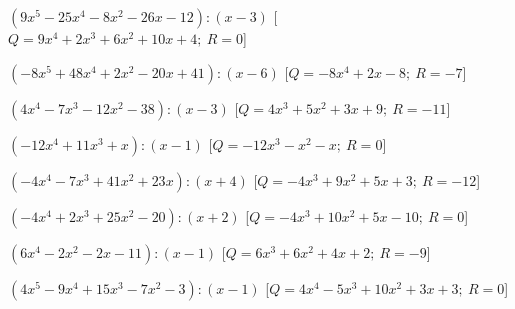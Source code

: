 \begin{esercizio}
\begin{enumeratea}
  \item  \(\left(9 x^5 -25 x^4 -8 x^2 -26 x -12 \right) : 
           \left(x -3 \right)\)
   \hfill [\(Q = 9 x^4 +2 x^3 +6 x^2 +10 x +4;~R = 0\)]
  \item  \(\left(-8 x^5 +48 x^4 +2 x^2 -20 x +41 \right) : \left(x -6 \right)\)
   \hfill [\(Q = -8 x^4 +2 x -8;~R = -7\)]
  \item  \(\left(4 x^4 -7 x^3 -12 x^2 -38 \right) : \left(x -3 \right)\)
   \hfill [\(Q = 4 x^3 +5 x^2 +3 x +9;~R = -11\)]
  \item  \(\left(-12 x^4 +11 x^3 + x \right) : \left(x -1 \right)\)
   \hfill [\(Q = -12 x^3 - x^2 - x ;~R = 0\)]
  \item  \(\left(-4 x^4 -7 x^3 +41 x^2 +23 x  \right) : \left(x +4 \right)\)
   \hfill [\(Q = -4 x^3 +9 x^2 +5 x +3;~R = -12\)]
  \item  \(\left(-4 x^4 +2 x^3 +25 x^2 -20 \right) : \left(x +2 \right)\)
   \hfill [\(Q = -4 x^3 +10 x^2 +5 x -10;~R = 0\)]
  \item  \(\left(6 x^4 -2 x^2 -2 x -11 \right) : \left(x -1 \right)\)
   \hfill [\(Q = 6 x^3 +6 x^2 +4 x +2;~R = -9\)]
  \item  \(\left(4 x^5 -9 x^4 +15 x^3 -7 x^2 -3 \right) : 
           \left(x -1 \right)\)
   \hfill [\(Q = 4 x^4 -5 x^3 +10 x^2 +3 x +3;~R = 0\)]
 \end{enumeratea}
\end{esercizio}

